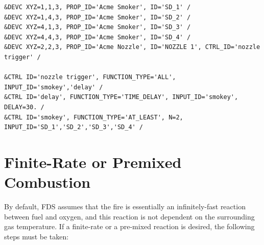 \documentclass[11pt]{book}
\begin{document}
\footnotesize
\begin{verbatim}
&DEVC XYZ=1,1,3, PROP_ID='Acme Smoker', ID='SD_1' /
&DEVC XYZ=1,4,3, PROP_ID='Acme Smoker', ID='SD_2' /
&DEVC XYZ=4,1,3, PROP_ID='Acme Smoker', ID='SD_3' /
&DEVC XYZ=4,4,3, PROP_ID='Acme Smoker', ID='SD_4' /
&DEVC XYZ=2,2,3, PROP_ID='Acme Nozzle', ID='NOZZLE 1', CTRL_ID='nozzle trigger' /

&CTRL ID='nozzle trigger', FUNCTION_TYPE='ALL', INPUT_ID='smokey','delay' /
&CTRL ID='delay', FUNCTION_TYPE='TIME_DELAY', INPUT_ID='smokey', DELAY=30. /
&CTRL ID='smokey', FUNCTION_TYPE='AT_LEAST', N=2, INPUT_ID='SD_1','SD_2','SD_3','SD_4' /
\end{verbatim}
\normalsize





\section{Finite-Rate or Premixed Combustion}
\label{info:finite}

By default, FDS assumes that the fire is essentially an infinitely-fast
reaction between fuel and oxygen, and this reaction is not dependent on
the surrounding gas temperature.
If a finite-rate or a pre-mixed reaction is desired, the
following steps must be taken:
\end{document}
